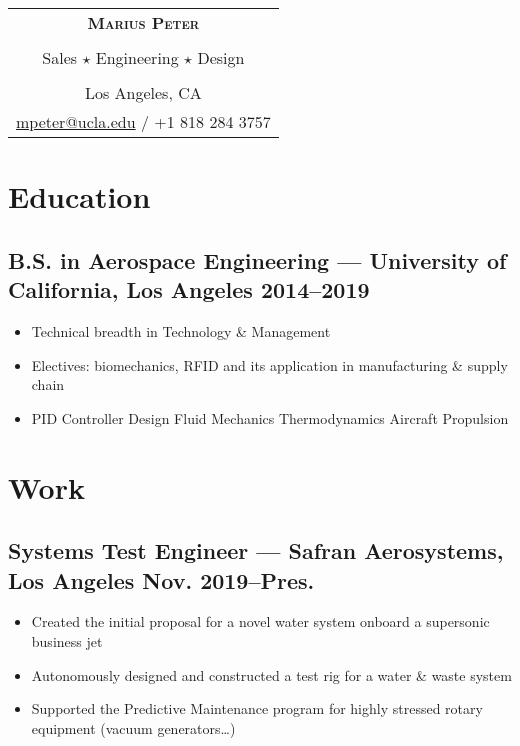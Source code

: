\documentclass[10pt]{article}
\date{}
\title{}
\begin{document}
\begin{center}
\begin{tabular}{c}
\huge \textbf{\textsc{Marius Peter}}\\
\\
\Large Sales \(\star\) Engineering \(\star\) Design\\
\\
Los Angeles, CA\\
\href{mailto:mpeter@ucla.edu}{mpeter@ucla.edu} / +1 818 284 3757\\
\end{tabular}

\end{center}

\section*{Education}
\label{sec:orgaca5e3e}

\subsection*{B.S. in Aerospace Engineering --- University of California, Los Angeles \hfill 2014--2019}
\label{sec:org1f707c1}

\begin{itemize}
\item Technical breadth in Technology \& Management
\item Electives: biomechanics, RFID and its application in manufacturing \& supply
chain
\item PID Controller Design \textbullet
Fluid Mechanics \textbullet
Thermodynamics \textbullet
Aircraft Propulsion \textbullet
\end{itemize}

\section*{Work}
\label{sec:orgb905bad}

\subsection*{Systems Test Engineer --- Safran Aerosystems, Los Angeles \hfill Nov. 2019--Pres.}
\label{sec:orgd77406b}

\begin{itemize}
\item Created the initial proposal for a novel water system onboard a supersonic
business jet
\item Autonomously designed and constructed a test rig for a water \& waste system
\item Supported the Predictive Maintenance program for highly stressed rotary
equipment (vacuum generators\ldots{})
\end{itemize}
\end{document}

